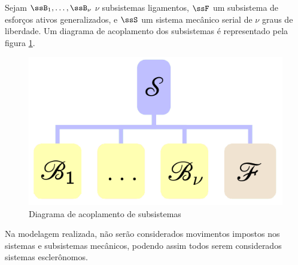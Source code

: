 \documentclass[]{politex}
\begin{document}
Sejam $\ssB_1,\hdots,\ssB_\nu$ $\nu$ subsistemas ligamentos, $\ssF$ um subsistema de esforços ativos generalizados, e $\ssS$ um sistema mecânico serial de $\nu$ graus de liberdade. Um diagrama de acoplamento dos subsistemas é representado pela figura \ref{fig:AcoplamentoMecSerial}.
\begin{figure}[H]
	\centering
	\includegraphics[scale=0.42]{imagens/DiagramaAcoplamentoMecSerial.png}  
	\caption{Diagrama de acoplamento de subsistemas}
	\label{fig:AcoplamentoMecSerial}
\end{figure}

Na modelagem realizada, não serão considerados movimentos impostos nos sistemas e subsistemas mecânicos, podendo assim todos serem considerados sistemas esclerônomos.
\end{document}
